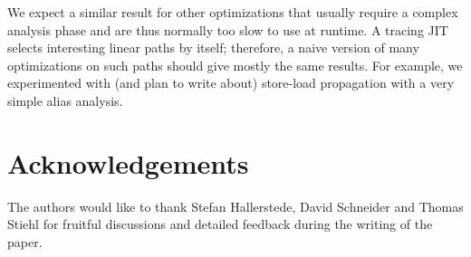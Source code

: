 \documentclass{sigplanconf}
\begin{document}
We expect a similar result for other optimizations that usually require
a complex analysis phase and are thus normally too slow to use at
runtime.  A tracing JIT selects interesting linear paths by itself;
therefore, a naive version of many optimizations on such paths should
give mostly the same results.  For example, we experimented with (and
plan to write about) store-load propagation with a very simple alias
analysis.


\section*{Acknowledgements}

The authors would like to thank Stefan Hallerstede, David Schneider and Thomas
Stiehl for fruitful discussions and detailed feedback during the writing of the
paper.



\end{document}
